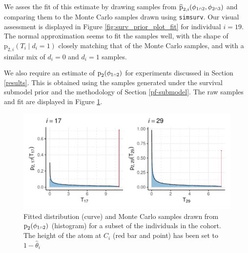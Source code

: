 \documentclass[
  10pt,
  a4paper,
]{article}
\let\Oldcap\cap
\renewcommand{\cap}{\mathrel{\mathsmaller{\Oldcap}}}
\newcommand{\pd}{\text{p}}
\begin{document}
We asses the fit of this estimate by drawing samples from
\(\widehat{\pd}_{2, i}(\phi_{1 \cap 2}, \phi_{2 \cap 3})\) and comparing
them to the Monte Carlo samples drawn using \texttt{simsurv}. Our visual
assessment is displayed in Figure \ref{fig:surv_prior_plot_fit} for
individual \(i = 19\). The normal approximation seems to fit the samples
well, with the shape of \(\pd_{2, i}(T_{i} \mid d_{i} = 1)\) closely
matching that of the Monte Carlo samples, and with a similar mix of
\(d_{i} = 0\) and \(d_{i} = 1\) samples.

We also require an estimate of \(\pd_{2}(\phi_{1 \cap 2})\) for
experiments discussed in Section \ref{results}. This is obtained using
the samples generated under the survival submodel prior and the
methodology of Section \ref{pf-submodel}. The raw samples and fit are
displayed in Figure \ref{fig:surv_prior_phi_12_marginal_plot_fit}.

\begin{figure}

{\centering \includegraphics{../plots/mimic-example/submodel-2-phi-12-marginal-fit-plot-small} 

}

\caption{Fitted distribution (curve) and Monte Carlo samples drawn from $\pd_{2}(\phi_{1 \cap 2})$ (histogram) for a subset of the individuals in the cohort. The height of the atom at $C_{i}$ (red bar and point) has been set to $1 - \widehat{\theta}_{i}$}\label{fig:surv_prior_phi_12_marginal_plot_fit}
\end{figure}
\end{document}
